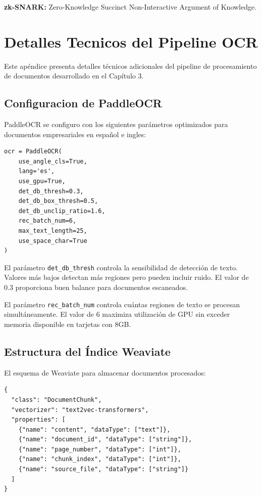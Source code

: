 \documentclass[12pt,a4paper,twoside]{book}
\begin{document}
\textbf{zk-SNARK:} Zero-Knowledge Succinct Non-Interactive Argument of Knowledge.

\chapter{Detalles Tecnicos del Pipeline OCR}

Este apéndice presenta detalles técnicos adicionales del pipeline de procesamiento de documentos desarrollado en el Capítulo 3.

\section{Configuracion de PaddleOCR}

PaddleOCR se configuro con los siguientes parámetros optimizados para documentos empresariales en español e ingles:

\begin{verbatim}
ocr = PaddleOCR(
    use_angle_cls=True,
    lang='es',
    use_gpu=True,
    det_db_thresh=0.3,
    det_db_box_thresh=0.5,
    det_db_unclip_ratio=1.6,
    rec_batch_num=6,
    max_text_length=25,
    use_space_char=True
)
\end{verbatim}

El parámetro \texttt{det\_db\_thresh} controla la sensibilidad de detección de texto. Valores más bajos detectan más regiones pero pueden incluir ruido. El valor de 0.3 proporciona buen balance para documentos escaneados.

El parámetro \texttt{rec\_batch\_num} controla cuántas regiones de texto se procesan simultáneamente. El valor de 6 maximiza utilización de GPU sin exceder memoria disponible en tarjetas con 8GB.

\section{Estructura del Índice Weaviate}

El esquema de Weaviate para almacenar documentos procesados:

\begin{verbatim}
{
  "class": "DocumentChunk",
  "vectorizer": "text2vec-transformers",
  "properties": [
    {"name": "content", "dataType": ["text"]},
    {"name": "document_id", "dataType": ["string"]},
    {"name": "page_number", "dataType": ["int"]},
    {"name": "chunk_index", "dataType": ["int"]},
    {"name": "source_file", "dataType": ["string"]}
  ]
}
\end{verbatim}
\end{document}
